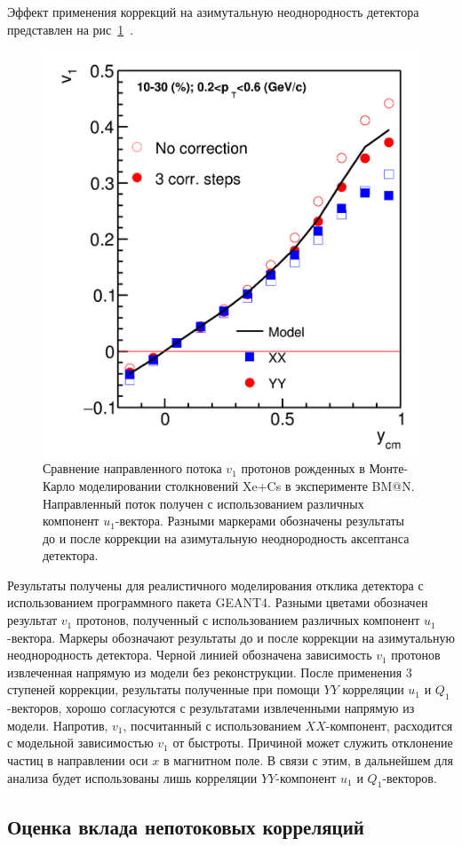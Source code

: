 Эффект применения коррекций на азимутальную неоднородность детектора представлен на рис~\ref{fig:bmn_components}~\cite{Mamaev:2023yhz}.
%
\begin{figure}[ht]
\begin{center}
\includegraphics[width=0.45\linewidth]{images/v1_proton_correction_rapidity.png}
\caption{Сравнение направленного потока $v_1$ протонов рожденных в Монте-Карло моделировании столкновений Xe+Cs в эксперименте BM@N. Направленный поток получен с использованием различных компонент $u_1$-вектора. Разными маркерами обозначены результаты до и после коррекции на азимутальную неоднородность аксептанса детектора. }
\label{fig:bmn_components}
\end{center}
\end{figure}

Результаты получены для реалистичного моделирования отклика детектора с использованием программного пакета GEANT4.
Разными цветами обозначен результат $v_1$ протонов, полученный с использованием различных компонент $u_1$-вектора. 
Маркеры обозначают результаты до и после коррекции на азимутальную неоднородность детектора.
Черной линией обозначена зависимость $v_1$ протонов извлеченная напрямую из модели без реконструкции.
После применения 3 ступеней коррекции, результаты полученные при помощи $YY$ корреляции $u_1$ и $Q_1$-векторов, хорошо согласуются с результатами извлеченными напрямую из модели.
Напротив, $v_1$, посчитанный с использованием $XX$-компонент, расходится с модельной зависимостью $v_1$ от быстроты. 
Причиной может служить отклонение частиц в направлении оси $x$ в магнитном поле. 
В связи с этим, в дальнейшем для анализа будет использованы лишь корреляции $YY$-компонент $u_1$ и $Q_1$-векторов.

\subsection{Оценка вклада непотоковых корреляций}

